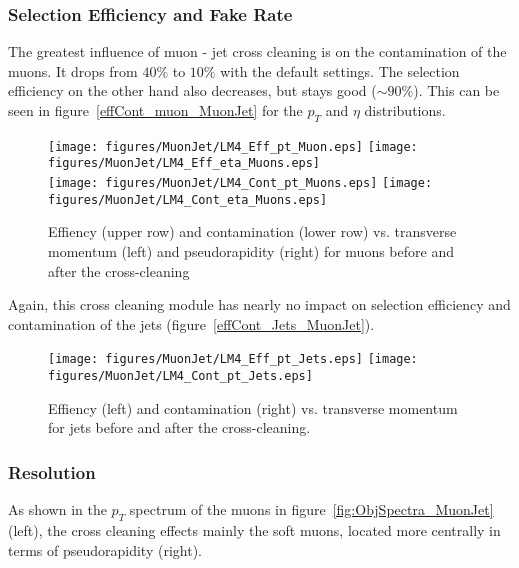 \documentclass{cmspaper}
\begin{document}
\subsubsection{Selection Efficiency and Fake Rate}
The greatest influence of muon - jet cross cleaning is on the contamination of the muons. It drops from \(40 \%\) to \(10 \%\) with the default settings. The selection efficiency on the other hand also decreases, but stays good (\(\sim 90\%\)). This can be seen in figure~\ref{effCont_muon_MuonJet} for the \(p_T\) and \(\eta\) distributions. 

\begin{figure}[hb]
\begin{center}
    \texttt{[image: figures/MuonJet/LM4\_Eff\_pt\_Muon.eps]}
    \texttt{[image: figures/MuonJet/LM4\_Eff\_eta\_Muons.eps]}\\
    \texttt{[image: figures/MuonJet/LM4\_Cont\_pt\_Muons.eps]}
    \texttt{[image: figures/MuonJet/LM4\_Cont\_eta\_Muons.eps]}
    \caption{Effiency (upper row) and contamination (lower row) vs. transverse momentum (left) and pseudorapidity (right) for muons before and after the cross-cleaning}
\label{fig:effCont_muon_MuonJet}
\end{center}
\end{figure}

Again, this cross cleaning module has nearly no impact on selection efficiency and contamination of the jets (figure~\ref{effCont_Jets_MuonJet}).

\begin{figure}[hb]
\begin{center}
    \texttt{[image: figures/MuonJet/LM4\_Eff\_pt\_Jets.eps]}
    \texttt{[image: figures/MuonJet/LM4\_Cont\_pt\_Jets.eps]}
    \caption{Effiency (left) and contamination (right) vs. transverse momentum for jets before
    and after the cross-cleaning.}
\label{fig:effCont_Jets_MuonJet}
\end{center}
\end{figure}

\subsubsection{Resolution}
As shown in the \(p_T\) spectrum of the muons in figure~\ref{fig:ObjSpectra_MuonJet} (left), the cross cleaning effects mainly the soft muons, located more centrally in terms of pseudorapidity (right).
\end{document}
